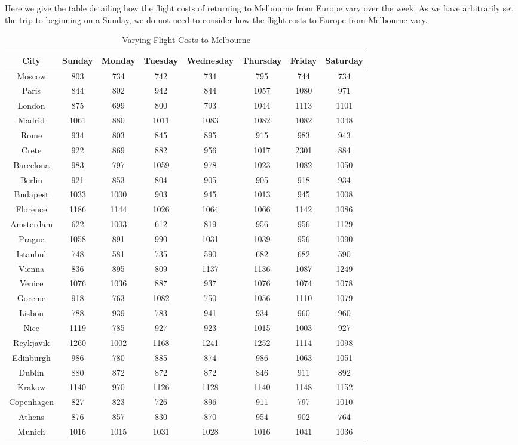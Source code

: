 \documentclass[12pt]{article}
\begin{document}
\pagebreak
Here we give the table detailing how the flight costs of returning to Melbourne from Europe vary over the week. As we have arbitrarily set the trip to beginning on a Sunday, we do not need to consider how the flight costs to Europe from Melbourne vary.

\begin{table}[h]
\caption{Varying Flight Costs to Melbourne}
\centering
\vspace{1mm}
\begin{tabular}{c|c|c|c|c|c|c|c}
\hline
\rule{0pt}{2ex} City & Sunday & Monday & Tuesday & Wednesday & Thursday & Friday & Saturday \\
\hline
\rule{0pt}{2ex}Moscow & 803 & 734 & 742 & 734 & 795 & 744 & 734 \\
Paris & 844 & 802 & 942 & 844 & 1057 & 1080 & 971 \\
London & 875 & 699 & 800 & 793 & 1044 & 1113 & 1101 \\
Madrid & 1061 & 880 & 1011 & 1083 & 1082 & 1082 & 1048 \\
Rome & 934 & 803 & 845 & 895 & 915 & 983 & 943 \\
Crete & 922 & 869 & 882 & 956 & 1017 & 2301 & 884 \\
Barcelona & 983 & 797 & 1059 & 978 & 1023 & 1082 & 1050 \\
Berlin & 921 & 853 & 804 & 905 & 905 & 918 & 934 \\
Budapest & 1033 & 1000 & 903 & 945 & 1013 & 945 & 1008 \\
Florence & 1186 & 1144 & 1026 & 1064 & 1066 & 1142 & 1086 \\
Amsterdam & 622 & 1003 & 612 & 819 & 956 & 956 & 1129 \\
Prague & 1058 & 891 & 990 & 1031 & 1039 & 956 & 1090 \\
Istanbul & 748 & 581 & 735 & 590 & 682 & 682 & 590 \\
Vienna & 836 & 895 & 809 & 1137 & 1136 & 1087 & 1249 \\
Venice & 1076 & 1036 & 887 & 937 & 1076 & 1074 & 1078 \\
Goreme & 918 & 763 & 1082 & 750 & 1056 & 1110 & 1079 \\
Lisbon & 788 & 939 & 783 & 941 & 934 & 960 & 960 \\
Nice & 1119 & 785 & 927 & 923 & 1015 & 1003 & 927 \\
Reykjavik & 1260 & 1002 & 1168 & 1241 & 1252 & 1114 & 1098 \\
Edinburgh & 986 & 780 & 885 & 874 & 986 & 1063 & 1051 \\
Dublin & 880 & 872 & 872 & 872 & 846 & 911 & 892 \\
Krakow & 1140 & 970 & 1126 & 1128 & 1140 & 1148 & 1152 \\
Copenhagen & 827 & 823 & 726 & 896 & 911 & 797 & 1010 \\
Athens & 876 & 857 & 830 & 870 & 954 & 902 & 764 \\
Munich & 1016 & 1015 & 1031 & 1028 & 1016 & 1041 & 1036 \\

\end{tabular}
\end{table}
\end{document}
